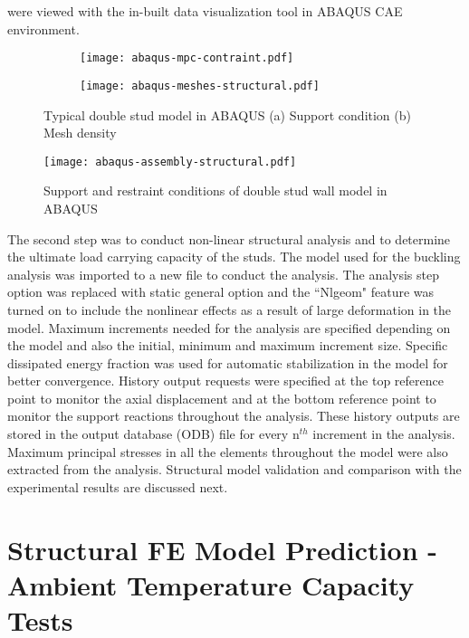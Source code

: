 were viewed with the in-built data visualization tool in ABAQUS CAE environment.
\begin{figure}[!htbp]
	\centering
	\begin{subfigure}[b]{0.4\textwidth}
		\centering
		\texttt{[image: abaqus-mpc-contraint.pdf]}
		\caption{}
		\label{subfig:abaqus-mpc-contraint}
	\end{subfigure}
	\begin{subfigure}[b]{0.4\textwidth}
		\centering
		\texttt{[image: abaqus-meshes-structural.pdf]}
		\caption{}
		\label{subfig:abaqus-meshes-structural}
	\end{subfigure}
	   \caption{Typical double stud model in ABAQUS (a) Support condition (b) Mesh density}
	   \label{fig:abaqus-typical-model}
\end{figure}
\begin{figure}[!htbp]
	\centering
			\texttt{[image: abaqus-assembly-structural.pdf]}\\
		\caption{Support and restraint conditions of double stud wall model in ABAQUS}
		\label{fig:abaqus-full-assembly}
\end{figure}

The second step was to conduct non-linear structural analysis and to determine the ultimate load carrying capacity of the studs. The model used for the buckling analysis was imported to a new file to conduct the analysis. The analysis step option was replaced with static general option and the ``Nlgeom" feature was turned on to include the nonlinear effects as a result of large deformation in the model. Maximum increments needed for the analysis are specified depending on the model and also the initial, minimum and maximum increment size. Specific dissipated energy fraction was used for automatic stabilization in the model for better convergence. History output requests were specified at the top reference point to monitor the axial displacement and at the bottom reference point to monitor the support reactions throughout the analysis. These history outputs are stored in the output database (ODB) file for every n\(^{th}\) increment in the analysis. Maximum principal stresses in all the elements throughout the model were also extracted from the analysis. Structural model validation and comparison with the experimental results are discussed next.

\section{Structural FE Model Prediction - Ambient Temperature Capacity Tests}

